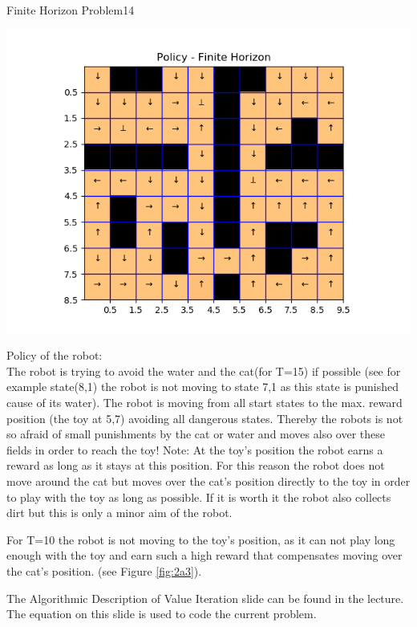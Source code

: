 \begin{questions}
\begin{question}{Finite Horizon Problem}{14}
\begin{answer}
\begin{minipage}{.5\textwidth}
	\includegraphics[width=1\textwidth]{img/2a_T10.png} 
	\label{fig:2a3}               
\end{minipage}

Policy of the robot:\\
The robot is trying to avoid the water and the cat(for T=15) if possible (see for example state(8,1) the robot is not moving to state 7,1 as this state is punished cause of its water). The robot is moving from all start states to the max. reward position (the toy at 5,7) avoiding all dangerous states. Thereby the robots is not so afraid of small punishments by the cat or water and moves also over these fields in order to reach the toy! Note: At the toy's position the robot earns a reward as long as it stays at this position. For this reason the robot does not move around the cat but moves over the cat's position directly to the toy in order to play with the toy as long as possible. If it is worth it the robot also collects dirt but this is only a minor aim of the robot.

For T=10 the robot is not moving to the toy's position, as it can not play long enough with the toy and earn such a high reward that compensates moving over the cat's position. (see Figure \ref{fig:2a3}).

The Algorithmic Description of Value Iteration slide can be found in the lecture. The equation on this slide is used to code the current problem.
	
\end{answer}

\end{question}


\end{questions}
